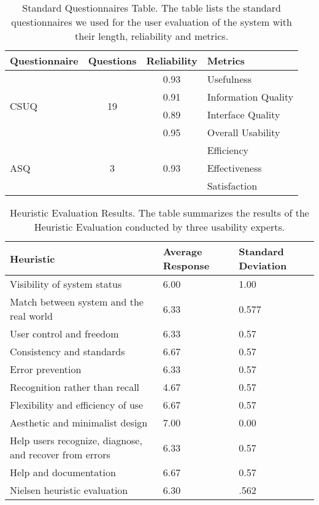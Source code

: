 \documentclass[twocolumn]{bmcart}%
\begin{document}
\begin{backmatter}
\begin{table}[h!]
\begin{tabular}{lcc}
      \end{tabular}
\label{tbl:features}
\end{table}

\begin{table}[h!]
\caption{Standard Questionnaires Table. The table lists the standard questionnaires we used for the user evaluation of the system with their length, reliability and metrics.}
      \begin{tabular}{lccl}
        \hline
        Questionnaire & Questions & Reliability & Metrics \\ \hline
        \multirow{4}{*}{CSUQ} & \multirow{4}{*}{19} & 0.93 & Usefulness \\
         & & 0.91 & Information Quality \\
    		 & & 0.89 & Interface Quality \\
    		 & & 0.95 & Overall Usability \\ \hline
        \multirow{3}{*}{ASQ} & \multirow{3}{*}{3} & \multirow{3}{*}{0.93} & Efficiency \\
         & & & Effectiveness \\
         & & & Satisfaction \\ \hline
		
      \end{tabular}
\label{tbl:questionnaires}
\end{table}

\begin{table}[h!]
\caption{Heuristic Evaluation Results. The table summarizes the results of the Heuristic Evaluation conducted by three usability experts.}
      \begin{tabular}{p{3.85cm}R{1.2cm}R{1.2cm}}
      \hline
      Heuristic & Average Response & Standard Deviation \\ \hline
      Visibility of system status & 6.00 & 1.00 \\
      Match between system and the real world & 6.33 & 0.577 \\
      User control and freedom & 6.33 & 0.57 \\
      Consistency and standards & 6.67 & 0.57 \\
      Error prevention & 6.33 & 0.57 \\
      Recognition rather than recall & 4.67 & 0.57 \\
      Flexibility and efficiency of use & 6.67 & 0.57 \\
      Aesthetic and minimalist design & 7.00 & 0.00 \\
      Help users recognize, diagnose, and recover from errors & 6.33 & 0.57 \\
      Help and documentation & 6.67 & 0.57 \\ \hline
      Nielsen heuristic evaluation & 6.30 & .562 \\ \hline
      \end{tabular}
\label{tbl:heuristicsResults}
\end{table}


\end{backmatter}
\end{document}
